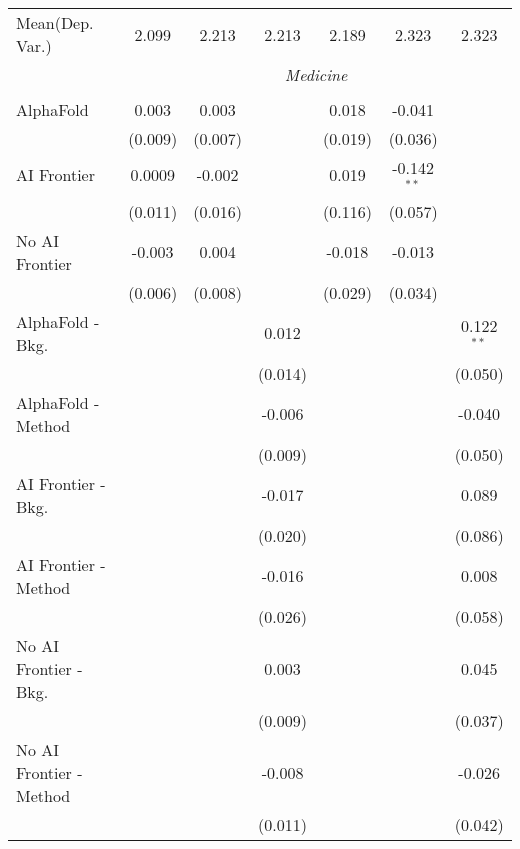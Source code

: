 \begin{tabular}{lcccccc}
Mean(Dep. Var.) & 2.099 & 2.213 & 2.213 & 2.189 & 2.323 & 2.323 \\
 & \multicolumn{6}{c}{\textit{Medicine}} \\ \\
   AlphaFold               & 0.003   & 0.003   &         & 0.018   & -0.041        &   \\   
                           & (0.009) & (0.007) &         & (0.019) & (0.036)       &   \\   
   AI Frontier             & 0.0009  & -0.002  &         & 0.019   & -0.142$^{**}$ &   \\   
                           & (0.011) & (0.016) &         & (0.116) & (0.057)       &   \\   
   No AI Frontier          & -0.003  & 0.004   &         & -0.018  & -0.013        &   \\   
                           & (0.006) & (0.008) &         & (0.029) & (0.034)       &   \\   
   AlphaFold - Bkg.        &         &         & 0.012   &         &               & 0.122$^{**}$\\   
                           &         &         & (0.014) &         &               & (0.050)\\   
   AlphaFold - Method      &         &         & -0.006  &         &               & -0.040\\   
                           &         &         & (0.009) &         &               & (0.050)\\   
   AI Frontier - Bkg.      &         &         & -0.017  &         &               & 0.089\\   
                           &         &         & (0.020) &         &               & (0.086)\\   
   AI Frontier - Method    &         &         & -0.016  &         &               & 0.008\\   
                           &         &         & (0.026) &         &               & (0.058)\\   
   No AI Frontier - Bkg.   &         &         & 0.003   &         &               & 0.045\\   
                           &         &         & (0.009) &         &               & (0.037)\\   
   No AI Frontier - Method &         &         & -0.008  &         &               & -0.026\\   
                           &         &         & (0.011) &         &               & (0.042)\\   

\end{tabular}
